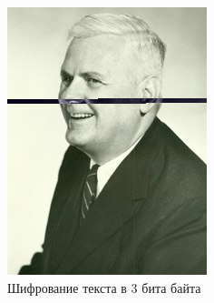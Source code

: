 \documentclass[10pt,a4paper,final]{article} %
\begin{document}
\begin{figure}[h!]
	\centering
	\begin{minipage}{0.3\textwidth}
		\centering
		\includegraphics[width=\linewidth]{img/Haskell_3 (1)}
		\caption{Шифрование текста в 3 бита байта}
	\end{minipage}
	\hspace{0.02\textwidth}
	\begin{minipage}{0.3\textwidth}
		\centering

\end{minipage}
\end{figure}
\end{document}
